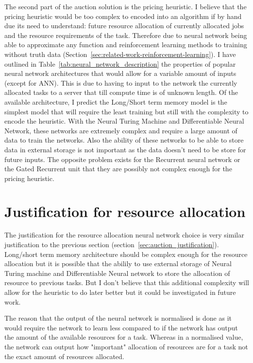 The second part of the auction solution is the pricing heuristic. I believe that the pricing heuristic would be too complex to encoded into
an algorithm if by hand due its need to understand: future resource allocation of currently allocated jobs and the resource requirements
of the task. Therefore due to neural network being able to approximate any function \citep{csaji2001approximation} and reinforcement learning
methods to training without truth data (Section~\ref{sec:related-work-reinforcement-learning}). I have outlined in Table~\ref{tab:neural_network_description} the properties of popular neural
network architectures that would allow for a variable amount of inputs (except for ANN). This is due to having to input to the network
the currently allocated tasks to a server that till compute time is of unknown length. Of the available architecture, I predict the
Long/Short term memory model is the simplest model that will require the least training but still with the complexity to encode the
heuristic. With the Neural Turing Machine and Differentiable Neural Network, these networks are extremely complex and require a large amount
of data to train the networks. Also the ability of these networks to be able to store data in external storage is not important as the data
doesn't need to be store for future inputs. The opposite problem exists for the Recurrent neural network or the Gated Recurrent unit that
they are possibly not complex enough for the pricing heuristic.

\section{Justification for resource allocation} \label{sec:just_resource_allocation}
The justification for the resource allocation neural network choice is very similar justification to the previous section
(section~\ref{sec:auction_justification}). Long/short term memory architecture should be complex enough for the resource allocation
but it is possible that the abilily to use external storage of Neural Turing machine and Differentiable Neural network to store the
allocation of resource to previous tasks. But I don't believe that this additional complexity will allow for the heuristic to do
later better but it could be investigated in future work.

The reason that the output of the neural network is normalised is done as it would require the network to learn less compared
to if the network has output the amount of the available resources for a task. Whereas in a normalised value, the network can
output how "important" allocation of resources are for a task not the exact amount of resources allocated.

